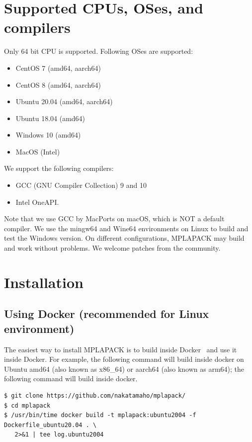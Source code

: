 \documentclass[12pt]{article}
\begin{document}
\section{Supported CPUs, OSes, and compilers}
\label{sec:supportedcpu}
Only 64 bit CPU is supported. Following OSes are supported:

\begin{itemize}
\item CentOS 7 (amd64, aarch64)
\item CentOS 8 (amd64, aarch64)
\item Ubuntu 20.04 (amd64, aarch64)
\item Ubuntu 18.04 (amd64)
\item Windows 10 (amd64)
\item MacOS (Intel)
\end{itemize}

We support the following compilers:
\begin{itemize}
\item GCC (GNU Compiler Collection) 9 and 10
\item Intel OneAPI.
\end{itemize}
Note that we use GCC by MacPorts on macOS, which is NOT a default compiler. We use the mingw64 and Wine64 environments on Linux to build and test the Windows version. On different configurations, MPLAPACK may build and work without problems. We welcome patches from the community.

\section{Installation}
\label{sec:howtoinstall}
\subsection{Using Docker (recommended for Linux environment)}
The easiest way to install MPLAPACK is to build inside Docker~\cite{merkel2014docker} and use it inside Docker. 
For example, the following command will build inside docker on Ubuntu amd64 (also known as x86\_64) or aarch64 (also known as arm64); the following command will build inside docker.

\begin{verbatim}
$ git clone https://github.com/nakatamaho/mplapack/
$ cd mplapack
$ /usr/bin/time docker build -t mplapack:ubuntu2004 -f Dockerfile_ubuntu20.04 . \
   2>&1 | tee log.ubuntu2004
\end{verbatim}
\end{document}
